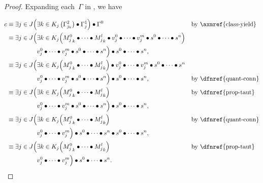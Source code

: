 \begin{proof}
  Expanding each~$\Gamma$ in ,
    we have

  \begin{alignat*}{3}
    c &\eejJ\Exists{k\in K_j}{\Gamma^2_{j_k}}
              \monoidop \Gamma^1_j
            \Big)
            \monoidop \Gamma^0
        &&\text{by \axmref{class-yield}} \\
      &\eejJ\exists{k\in K_j}\Big(
              \cpredmatseq \monoidop \cpredvecseq \monoidop \cpredscalarseq
            \Big) \\
      &\hphantom{\eejJ}\;\cpredvecseq \monoidop \cpredscalarseq \Big)
                \monoidop \cpredscalarseq, \\
      &\eejJ\exists{k\in K_j}\Big(\cpredmatseq\Big)
            \monoidop \cpredvecseq \monoidop \cpredscalarseq \\
      &\hphantom{\eejJ}\;\cpredvecseq \monoidop \cpredscalarseq \Big)
                \monoidop \cpredscalarseq,
        &&\text{by \dfnref{quant-conn}} \\
      &\eejJ\exists{k\in K_j}\Big(\cpredmatseq\Big)
        &&\text{by \dfnref{prop-taut}} \\
      &\hphantom{\eejJ}\;\cpredvecseq \monoidop \cpredscalarseq \Big)
                \monoidop \cpredscalarseq, \\
      &\eejJ\exists{k\in K_j}\Big(\cpredmatseq\Big)
        &&\text{by \dfnref{quant-conn}} \\
      &\hphantom{\eejJ}\;\cpredvecseq\Big) \monoidop \cpredscalarseq
                \monoidop \cpredscalarseq, \\
      &\eejJ\exists{k\in K_j}\Big(\cpredmatseq\Big)
        &&\text{by \dfnref{prop-taut}} \\
      &\hphantom{\eejJ}\;\cpredvecseq\Big)
                \monoidop \cpredscalarseq.
        \tag*{\qedhere} \\
  \end{alignat*}
\end{proof}


